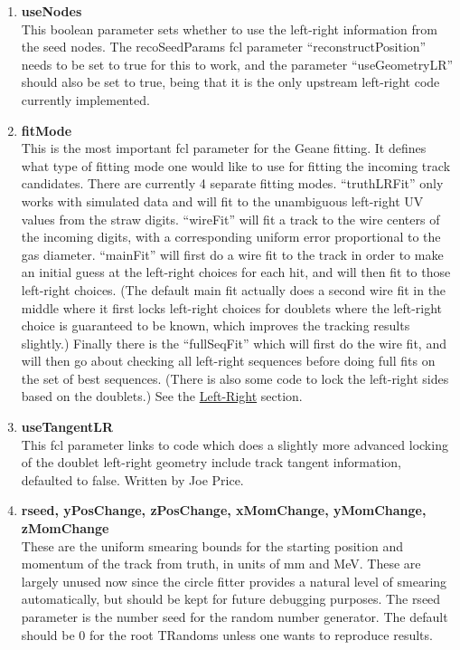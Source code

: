 \begin{enumerate}
      \item{\bf{useNodes}} \\
      This boolean parameter sets whether to use the left-right information from the seed nodes. The recoSeedParams fcl parameter ``reconstructPosition'' needs to be set to true for this to work, and the parameter ``useGeometryLR'' should also be set to true, being that it is the only upstream left-right code currently implemented.

      \item{\bf{fitMode}} \\
      This is the most important fcl parameter for the Geane fitting. It defines what type of fitting mode one would like to use for fitting the incoming track candidates. There are currently 4 separate fitting modes. ``truthLRFit'' only works with simulated data and will fit to the unambiguous left-right UV values from the straw digits. ``wireFit'' will fit a track to the wire centers of the incoming digits, with a corresponding uniform error proportional to the gas diameter. ``mainFit'' will first do a wire fit to the track in order to make an initial guess at the left-right choices for each hit, and will then fit to those left-right choices. (The default main fit actually does a second wire fit in the middle where it first locks left-right choices for doublets where the left-right choice is guaranteed to be known, which improves the tracking results slightly.) Finally there is the ``fullSeqFit'' which will first do the wire fit, and will then go about checking all left-right sequences before doing full fits on the set of best sequences. (There is also some code to lock the left-right sides based on the doublets.) See the \hyperref[sec:LR]{Left-Right} section.

      \item{\bf{useTangentLR}} \\
      This fcl parameter links to code which does a slightly more advanced locking of the doublet left-right geometry include track tangent information, defaulted to false. Written by Joe Price.

      \item{\bf{rseed, yPosChange, zPosChange, xMomChange, yMomChange, zMomChange}} \\
      These are the uniform smearing bounds for the starting position and momentum of the track from truth, in units of mm and MeV. These are largely unused now since the circle fitter provides a natural level of smearing automatically, but should be kept for future debugging purposes. The rseed parameter is the number seed for the random number generator. The default should be 0 for the root TRandoms unless one wants to reproduce results.

    \end{enumerate}


